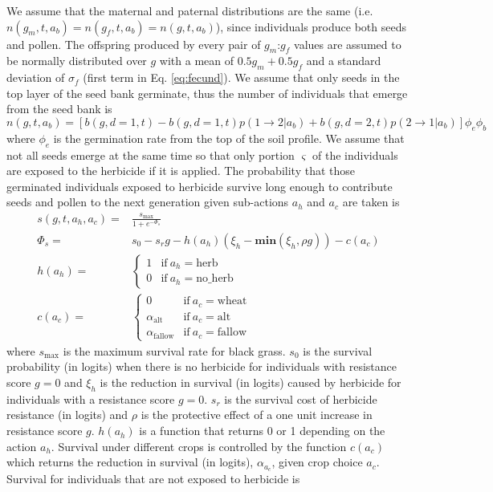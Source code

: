 \documentclass[12pt, a4paper]{article}
\begin{document}
We assume that the maternal and paternal distributions are the same (i.e. $n(g_m, t, a_b) = n(g_f, t, a_b) = n(g, t, a_b)$), since individuals produce both seeds and pollen. The offspring produced by every pair of $g_m$:$g_f$ values are assumed to be normally distributed over $g$ with a mean of $0.5g_m + 0.5g_f$ and a standard deviation of $\sigma_f$ (first term in Eq. \ref{eq:fecund}). We assume that only seeds in the top layer of the seed bank germinate, thus the number of individuals that emerge from the seed bank is
\begin{equation}\label{eq:above_ground}
	n(g, t, a_b) = [b(g, d = 1, t) - b(g, d = 1, t)p(1 \rightarrow 2|a_b) + b(g, d = 2, t)p(2 \rightarrow 1|a_b)]\phi_e\phi_b
\end{equation}
where $\phi_e$ is the germination rate from the top of the soil profile. We assume that not all seeds emerge at the same time so that only portion $\varsigma$ of the individuals are exposed to the herbicide if it is applied. The probability that those germinated individuals exposed to herbicide survive long enough to contribute seeds and pollen to the next generation given sub-actions $a_h$ and $a_c$ are taken is 
\begin{align}\label{eq:survival_herb}
	s(g, t, a_h, a_c) =& \frac{s_\text{max}}{1 + e^{-\Phi_s}}\\
	\Phi_s =& s_0 - s_rg - h(a_h)\left(\xi_h - \textbf{min}(\xi_h, \rho g) \right) - c(a_c)\\
	h(a_h) =& \begin{cases}
		1 &\text{if}~a_h = \text{herb}\\
		0 &\text{if}~a_h = \text{no\_herb}
	\end{cases}\\
	c(a_c) =& \begin{cases}
		0 &\text{if}~a_c = \text{wheat}\\
		\alpha_\text{alt} &\text{if}~a_c = \text{alt}\\
		\alpha_\text{fallow} &\text{if}~a_c = \text{fallow}
	\end{cases} 
\end{align}
where $s_\text{max}$ is the maximum survival rate for black grass. $s_0$ is the survival probability (in logits) when there is no herbicide for individuals with resistance score $g = 0$ and $\xi_h$ is the reduction in survival (in logits) caused by herbicide for individuals with a resistance score $g = 0$. $s_r$ is the survival cost of herbicide resistance (in logits) and $\rho$ is the protective effect of a one unit increase in resistance score $g$. $h(a_h)$ is a function that returns 0 or 1 depending on the action $a_h$. Survival under different crops is controlled by the function $c(a_c)$ which returns the reduction in survival (in logits), $\alpha_{a_c}$, given crop choice $a_c$. Survival for individuals that are not exposed to herbicide is   
\end{document}
